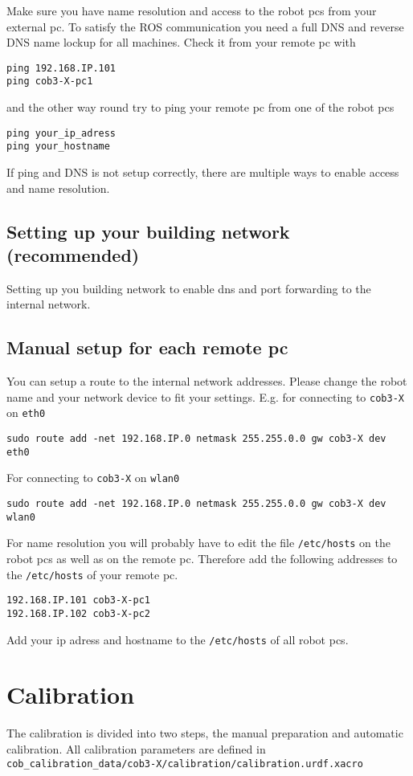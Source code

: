 Make sure you have name resolution and access to the robot pcs from your external pc. To satisfy the ROS communication you need a full DNS and reverse DNS name lockup for all machines. Check it from your remote pc with
\begin{lstlisting}
ping 192.168.IP.101
ping cob3-X-pc1
\end{lstlisting}
and the other way round try to ping your remote pc from one of the robot pcs
\begin{lstlisting}
ping your_ip_adress
ping your_hostname
\end{lstlisting}

If ping and DNS is not setup correctly, there are multiple ways to enable access and name resolution.

\subsection{Setting up your building network (recommended)}
Setting up you building network to enable dns and port forwarding to the internal network.

\subsection{Manual setup for each remote pc}
You can setup a route to the internal network addresses. Please change the robot name and your network device to fit your settings. E.g. for connecting to \texttt{cob3-X} on \texttt{eth0}
\begin{lstlisting}
sudo route add -net 192.168.IP.0 netmask 255.255.0.0 gw cob3-X dev eth0
\end{lstlisting}

For connecting to \texttt{cob3-X} on \texttt{wlan0}
\begin{lstlisting}
sudo route add -net 192.168.IP.0 netmask 255.255.0.0 gw cob3-X dev wlan0
\end{lstlisting}


For name resolution you will probably have to edit the file \texttt{/etc/hosts} on the robot pcs as well as on the remote pc. Therefore add the following addresses to the \texttt{/etc/hosts} of your remote pc.
\begin{lstlisting}
192.168.IP.101 cob3-X-pc1
192.168.IP.102 cob3-X-pc2
\end{lstlisting}

Add your ip adress and hostname to the \texttt{/etc/hosts} of all robot pcs.

\section{Calibration}
The calibration is divided into two steps, the manual preparation and automatic calibration. All calibration parameters are defined in \texttt{cob\_calibration\_data/cob3-X/calibration/calibration.urdf.xacro}

